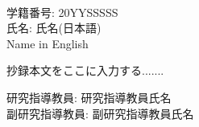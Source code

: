 \documentclass[a4paper,11pt,onecolumn]{jsarticle}
\begin{document}
\restoregeometry %
\thispagestyle{empty}

\begin{center}
\fontsize{14pt}{7mm} %
\vspace{0mm}
\\ 
\fontsize{14pt}{7mm} %
\end{center}

\vspace{2mm}

\begin{flushright}
学籍番号: \hspace{6.2mm} 20YYSSSSS \\ %
氏名: \hspace{6mm} 氏名(日本語) \\ %
Name in English %
\end{flushright}

抄録本文をここに入力する.......

\begin{flushright}
研究指導教員:  \hspace{9.2mm} 研究指導教員氏名 \\ %
副研究指導教員:  \hspace{6mm} 副研究指導教員氏名 %
\end{flushright}
\end{document}
